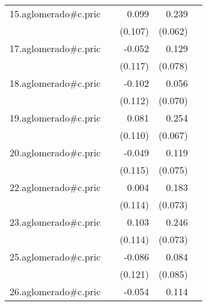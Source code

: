 {\begin{longtable}{l*{4}{D{.}{.}{-1}}}
\addlinespace
15.aglomerado#c.pric&                     &       0.099         &       0.239\sym{***}&                     \\
            &                     &     (0.107)         &     (0.062)         &                     \\
\addlinespace
17.aglomerado#c.pric&                     &      -0.052         &       0.129         &                     \\
            &                     &     (0.117)         &     (0.078)         &                     \\
\addlinespace
18.aglomerado#c.pric&                     &      -0.102         &       0.056         &                     \\
            &                     &     (0.112)         &     (0.070)         &                     \\
\addlinespace
19.aglomerado#c.pric&                     &       0.081         &       0.254\sym{***}&                     \\
            &                     &     (0.110)         &     (0.067)         &                     \\
\addlinespace
20.aglomerado#c.pric&                     &      -0.049         &       0.119         &                     \\
            &                     &     (0.115)         &     (0.075)         &                     \\
\addlinespace
22.aglomerado#c.pric&                     &       0.004         &       0.183\sym{*}  &                     \\
            &                     &     (0.114)         &     (0.073)         &                     \\
\addlinespace
23.aglomerado#c.pric&                     &       0.103         &       0.246\sym{***}&                     \\
            &                     &     (0.114)         &     (0.073)         &                     \\
\addlinespace
25.aglomerado#c.pric&                     &      -0.086         &       0.084         &                     \\
            &                     &     (0.121)         &     (0.085)         &                     \\
\addlinespace
26.aglomerado#c.pric&                     &      -0.054         &       0.114         &                     \\

\end{longtable}}
